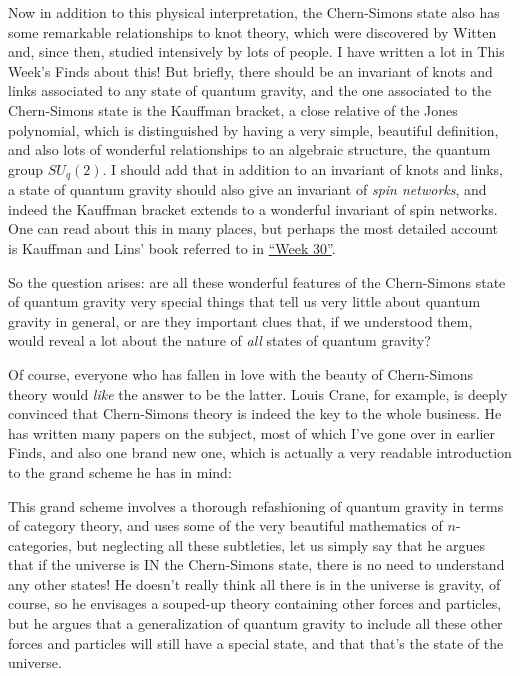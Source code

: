\documentclass{article}
\def\tightlist{}
\renewcommand{\texttt}[1]{%
  \begingroup
  \ttfamily
  \begingroup\lccode`~=`/\lowercase{\endgroup\def~}{/\discretionary{}{}{}}%
  \begingroup\lccode`~=`[\lowercase{\endgroup\def~}{[\discretionary{}{}{}}%
  \begingroup\lccode`~=`.\lowercase{\endgroup\def~}{.\discretionary{}{}{}}%
  \catcode`/=\active\catcode`[=\active\catcode`.=\active
  \scantokens{#1\noexpand}%
  \endgroup
}
\begin{document}
Now in addition to this physical interpretation, the Chern-Simons state
also has some remarkable relationships to knot theory, which were
discovered by Witten and, since then, studied intensively by lots of
people. I have written a lot in This Week's Finds about this! But
briefly, there should be an invariant of knots and links associated to
any state of quantum gravity, and the one associated to the Chern-Simons
state is the Kauffman bracket, a close relative of the Jones polynomial,
which is distinguished by having a very simple, beautiful definition,
and also lots of wonderful relationships to an algebraic structure, the
quantum group \(SU_q(2)\). I should add that in addition to an invariant
of knots and links, a state of quantum gravity should also give an
invariant of \emph{spin networks}, and indeed the Kauffman bracket
extends to a wonderful invariant of spin networks. One can read about
this in many places, but perhaps the most detailed account is Kauffman
and Lins' book referred to in \protect\hyperlink{week30}{``Week 30''}.

So the question arises: are all these wonderful features of the
Chern-Simons state of quantum gravity very special things that tell us
very little about quantum gravity in general, or are they important
clues that, if we understood them, would reveal a lot about the nature
of \emph{all} states of quantum gravity?

Of course, everyone who has fallen in love with the beauty of
Chern-Simons theory would \emph{like} the answer to be the latter. Louis
Crane, for example, is deeply convinced that Chern-Simons theory is
indeed the key to the whole business. He has written many papers on the
subject, most of which I've gone over in earlier Finds, and also one
brand new one, which is actually a very readable introduction to the
grand scheme he has in mind:


This grand scheme involves a thorough refashioning of quantum gravity in
terms of category theory, and uses some of the very beautiful
mathematics of \(n\)-categories, but neglecting all these subtleties,
let us simply say that he argues that if the universe is IN the
Chern-Simons state, there is no need to understand any other states! He
doesn't really think all there is in the universe is gravity, of course,
so he envisages a souped-up theory containing other forces and
particles, but he argues that a generalization of quantum gravity to
include all these other forces and particles will still have a special
state, and that that's the state of the universe.
\end{document}
